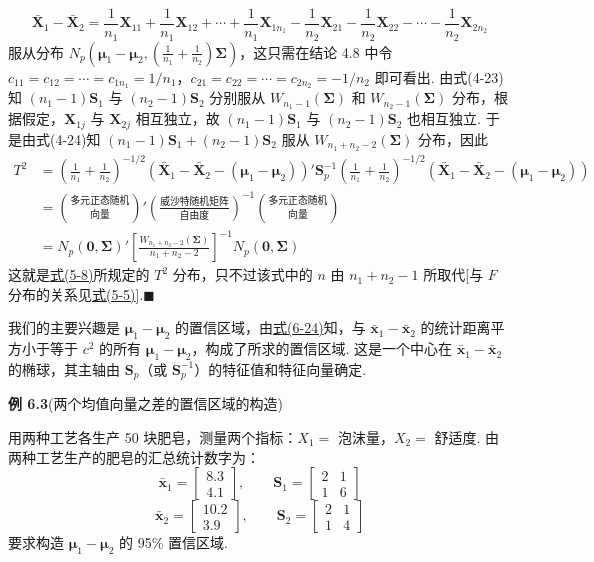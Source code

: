 \[
\bar{\mathbf{X}}_1-\bar{\mathbf{X}}_2=\frac{1}{n_1}\mathbf{X}_{11}+\frac{1}{n_1}\mathbf{X}_{12}+\cdots+\frac{1}{n_1}\mathbf{X}_{1n_1}-\frac{1}{n_2}\mathbf{X}_{21}-\frac{1}{n_2}\mathbf{X}_{22}-\cdots-\frac{1}{n_2}\mathbf{X}_{2n_2}
\]
服从分布 $N_p\left(\boldsymbol{\mu}_1-\boldsymbol{\mu}_2,\left(\frac{1}{n_1}+\frac{1}{n_2}\right)\boldsymbol{\Sigma}\right)$，这只需在结论 4.8 中令 $c_{11}=c_{12}=\cdots=c_{1n_1}=1/n_1$，$c_{21}=c_{22}=\cdots=c_{2n_2}=-1/n_2$ 即可看出. 由式(4-23)知 $(n_1-1)\mathbf{S}_1$ 与 $(n_2-1)\mathbf{S}_2$ 分别服从 $W_{n_1-1}(\boldsymbol{\Sigma})$ 和 $W_{n_2-1}(\boldsymbol{\Sigma})$ 分布，根据假定，$\mathbf{X}_{1j}$ 与 $\mathbf{X}_{2j}$ 相互独立，故 $(n_1-1)\mathbf{S}_1$ 与 $(n_2-1)\mathbf{S}_2$ 也相互独立. 于是由式(4-24)知 $(n_1-1)\mathbf{S}_1+(n_2-1)\mathbf{S}_2$ 服从 $W_{n_1+n_2-2}(\boldsymbol{\Sigma})$ 分布，因此
\[
\begin{aligned}
T^2&=\left(\frac{1}{n_1}+\frac{1}{n_2}\right)^{-1/2}(\bar{\mathbf{X}}_1-\bar{\mathbf{X}}_2-(\boldsymbol{\mu}_1-\boldsymbol{\mu}_2))'\mathbf{S}_p^{-1}\left(\frac{1}{n_1}+\frac{1}{n_2}\right)^{-1/2}(\bar{\mathbf{X}}_1-\bar{\mathbf{X}}_2-(\boldsymbol{\mu}_1-\boldsymbol{\mu}_2))\\
&=\binom{\text{多元正态随机}}{\text{向量}}'\left(\frac{\text{威沙特随机矩阵}}{\text{自由度}}\right)^{-1}\binom{\text{多元正态随机}}{\text{向量}}\\
&=N_p(\mathbf{0},\boldsymbol{\Sigma})'\left[\frac{W_{n_1+n_2-2}(\boldsymbol{\Sigma})}{n_1+n_2-2}\right]^{-1}N_p(\mathbf{0},\boldsymbol{\Sigma})
\end{aligned}
\]
这就是\hyperref[eq:5-8]{式(5-8)}所规定的 $T^2$ 分布，只不过该式中的 $n$ 由 $n_1+n_2-1$ 所取代[与 $F$ 分布的关系见\hyperref[eq:5-5]{式(5-5)}].\hfill$\blacksquare$

我们的主要兴趣是 $\boldsymbol{\mu}_1-\boldsymbol{\mu}_2$ 的置信区域，由\hyperref[eq:6-24]{式(6-24)}知，与 $\bar{\mathbf{x}}_1-\bar{\mathbf{x}}_2$ 的统计距离平方小于等于 $c^2$ 的所有 $\boldsymbol{\mu}_1-\boldsymbol{\mu}_2$，构成了所求的置信区域. 这是一个中心在 $\bar{\mathbf{x}}_1-\bar{\mathbf{x}}_2$ 的椭球，其主轴由 $\mathbf{S}_p$（或 $\mathbf{S}_p^{-1}$）的特征值和特征向量确定.

\noindent\textbf{例 6.3}\quad (两个均值向量之差的置信区域的构造)

用两种工艺各生产 50 块肥皂，测量两个指标：$X_1=$ 泡沫量，$X_2=$ 舒适度. 由两种工艺生产的肥皂的汇总统计数字为：
\[
\bar{\mathbf{x}}_1=\begin{bmatrix}8.3\\4.1\end{bmatrix},\qquad \mathbf{S}_1=\begin{bmatrix}2&1\\1&6\end{bmatrix}
\]
\[
\bar{\mathbf{x}}_2=\begin{bmatrix}10.2\\3.9\end{bmatrix},\qquad \mathbf{S}_2=\begin{bmatrix}2&1\\1&4\end{bmatrix}
\]
要求构造 $\boldsymbol{\mu}_1-\boldsymbol{\mu}_2$ 的 95\% 置信区域.

